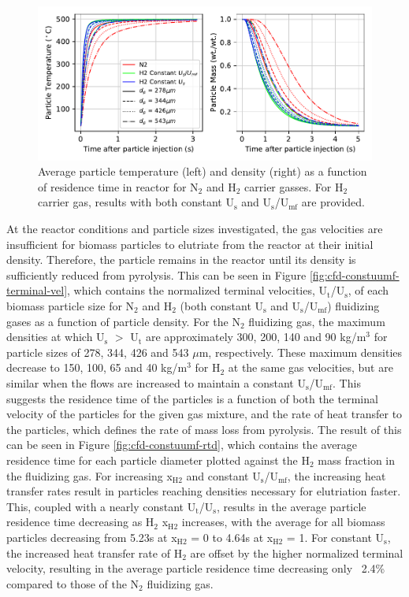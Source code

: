 \begin{figure}[H]
    \centering
    \includegraphics[width=\textwidth]{figures/cfd-constuumf-particle-temp-density.pdf}
    \caption{Average particle temperature (left) and density (right) as a function of residence time in reactor for N$_2$ and H$_2$ carrier gasses. For H$_2$ carrier gas, results with both constant U$_\text{s}$ and U$_\text{s}$/U$_\text{mf}$ are provided.}
    \label{fig:cfd-constuumf-particle-temp-density}
\end{figure}

At the reactor conditions and particle sizes investigated, the gas velocities are insufficient for biomass particles to elutriate from the reactor at their initial density. Therefore, the particle remains in the reactor until its density is sufficiently reduced from pyrolysis. This can be seen in Figure \ref{fig:cfd-constuumf-terminal-vel}, which contains the normalized terminal velocities, U$_\text{t}$/U$_\text{s}$, of each biomass particle size for N$_2$ and H$_2$ (both constant U$_\text{s}$ and U$_\text{s}$/U$_\text{mf}$) fluidizing gases as a function of particle density. For the N$_2$ fluidizing gas, the maximum densities at which U$_\text{s}$ $>$ U$_\text{t}$ are approximately 300, 200, 140 and 90 kg/m$^3$ for particle sizes of 278, 344, 426 and 543 $\mu$m, respectively. These maximum densities decrease to 150, 100, 65 and 40 kg/m$^3$ for H$_2$ at the same gas velocities, but are similar when the flows are increased to maintain a constant U$_\text{s}$/U$_\text{mf}$. This suggests the residence time of the particles is a function of both the terminal velocity of the particles for the given gas mixture, and the rate of heat transfer to the particles, which defines the rate of mass loss from pyrolysis. The result of this can be seen in Figure \ref{fig:cfd-constuumf-rtd}, which contains the average residence time for each particle diameter plotted against the H$_2$ mass fraction in the fluidizing gas. For increasing x$_\text{H2}$ and constant U$_\text{s}$/U$_\text{mf}$, the increasing heat transfer rates result in particles reaching densities necessary for elutriation faster. This, coupled with a nearly constant U$_\text{t}$/U$_\text{s}$, results in the average particle residence time decreasing as H$_2$ x$_\text{H2}$ increases, with the average for all biomass particles decreasing from 5.23s at x$_\text{H2}$ = 0 to 4.64s at x$_\text{H2}$ = 1. For constant U$_\text{s}$, the increased heat transfer rate of H$_2$ are offset by the higher normalized terminal velocity, resulting in the average particle residence time decreasing only ~2.4\% compared to those of the N$_2$ fluidizing gas.

